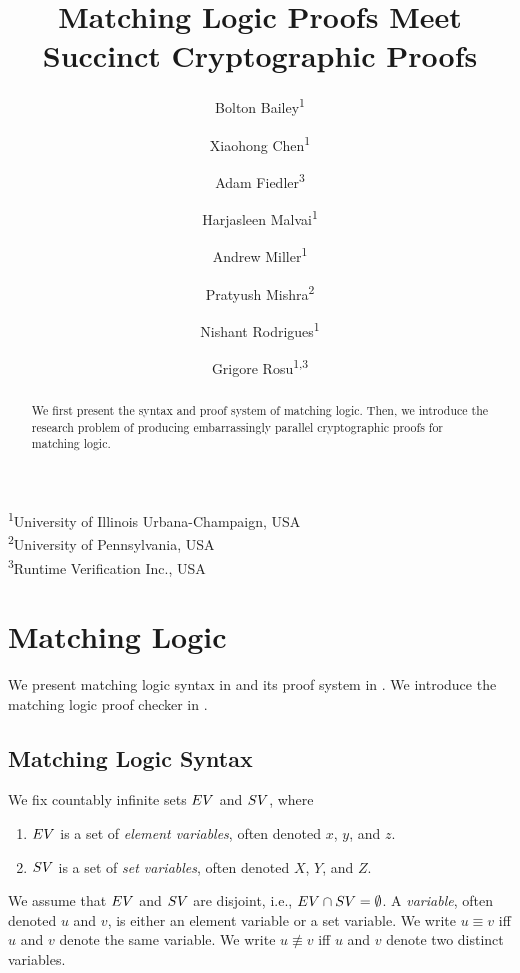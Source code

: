 \documentclass{article}
\title{Matching Logic Proofs Meet Succinct Cryptographic Proofs}
\author{Bolton Bailey\textsuperscript{1} \and Xiaohong Chen\textsuperscript{1} \and Adam Fiedler\textsuperscript{3} \and Harjasleen Malvai\textsuperscript{1} \and Andrew Miller\textsuperscript{1} \and Pratyush Mishra\textsuperscript{2} \and Nishant Rodrigues\textsuperscript{1} \and Grigore Rosu\textsuperscript{1,3}}
\date{}
\begin{document}
\maketitle
\begin{center}
\textsuperscript{1}University of Illinois Urbana-Champaign, USA\\
\textsuperscript{2}University of Pennsylvania, USA\\
\textsuperscript{3}Runtime Verification Inc., USA
\end{center}

\begin{abstract}
We first present the syntax and proof system of matching logic.
Then, we introduce the research problem of producing embarrassingly parallel
cryptographic proofs for matching logic.
\end{abstract}

\tableofcontents

\section{Matching Logic}

We present matching logic syntax in 
and its proof system in .
We introduce the matching logic proof checker in .

\subsection{Matching Logic Syntax}
\label{sec:ml_syntax}

We fix countably infinite sets $EV$ and $SV$, where
\begin{enumerate}
\item $EV$ is a set of \emph{element variables},
      often denoted $x$, $y$, and $z$.
\item $SV$ is a set of \emph{set variables},
      often denoted $X$, $Y$, and $Z$.
\end{enumerate}
We assume that $EV$ and $SV$ are disjoint, i.e., $EV \cap SV = \emptyset$.
A \emph{variable}, often denoted $u$ and $v$,
is either an element variable or a set variable.
We write $u \equiv v$ iff $u$ and $v$ denote the same variable.
We write $u \not\equiv v$ iff $u$ and $v$ denote two distinct variables.
\end{document}
